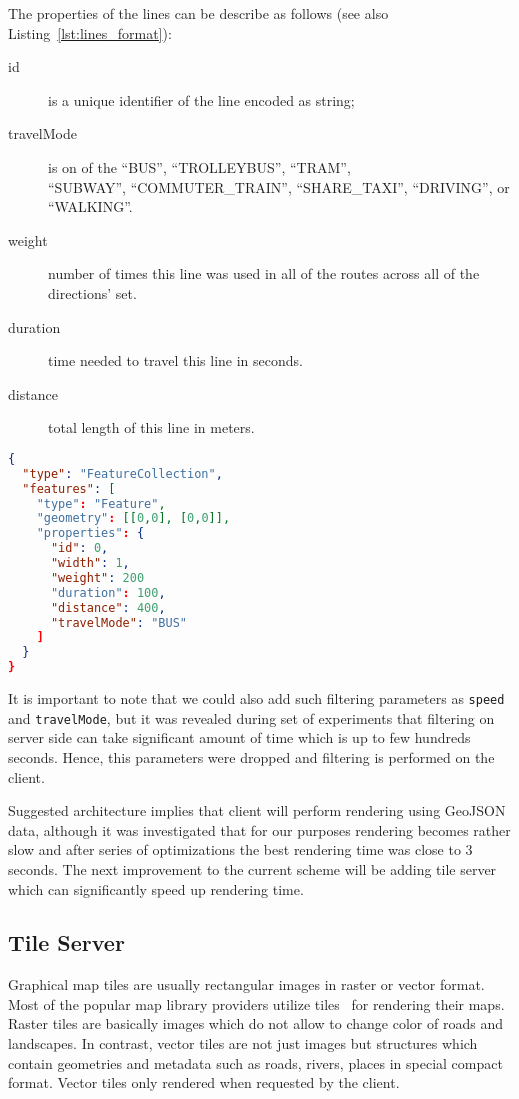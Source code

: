 \begin{itemize}
  The properties of the lines can be describe as follows (see also Listing~\ref{lst:lines_format}):
  \begin{description}
    \item[id] is a unique identifier of the line encoded as string;
    \item[travelMode] is on of the \mbox{``BUS''}, \mbox{``TROLLEYBUS''},
    \mbox{``TRAM''}, \\ \mbox{``SUBWAY''}, \mbox{``COMMUTER\_TRAIN''}, \mbox{``SHARE\_TAXI''},
    \mbox{``DRIVING''}, or \\ \mbox{``WALKING''}.
    \item[weight] number of times this line was used in all of the routes across all of
    the directions' set.
    \item[duration] time needed to travel this line in seconds.
    \item[distance] total length of this line in meters.
  \end{description}

\begin{lstlisting}[language=json, caption=Lines response example, label={lst:lines_format}]
{
  "type": "FeatureCollection",
  "features": [
    "type": "Feature",
    "geometry": [[0,0], [0,0]],
    "properties": {
      "id": 0,
      "width": 1,
      "weight": 200
      "duration": 100,
      "distance": 400,
      "travelMode": "BUS"
    ]
  }
}
\end{lstlisting}
\end{itemize}

It is important to note that we could also add such filtering parameters as \texttt{speed} and
\texttt{travelMode}, but it was revealed during set of experiments that
filtering on server side can take significant amount of time which is up to few
hundreds seconds. Hence, this parameters were dropped and filtering is performed on the client.

Suggested architecture implies that client will perform rendering using GeoJSON data, although
it was investigated that for our purposes rendering becomes rather slow and after series of
optimizations the best rendering time was close to 3 seconds. The next improvement to the
current scheme will be adding tile server which can significantly speed up rendering time.

\subsection{ Tile Server }
Graphical map tiles are usually rectangular images in raster or vector format. Most of the popular
map library providers utilize tiles~\cite{google:tiles, mapbox:tiles} for rendering their maps.
Raster tiles are basically images which do not allow to change color of roads and landscapes.
In contrast, vector tiles are not just images but structures which contain geometries and
metadata such as roads, rivers, places in special compact format. Vector tiles only rendered when
requested by the client.

